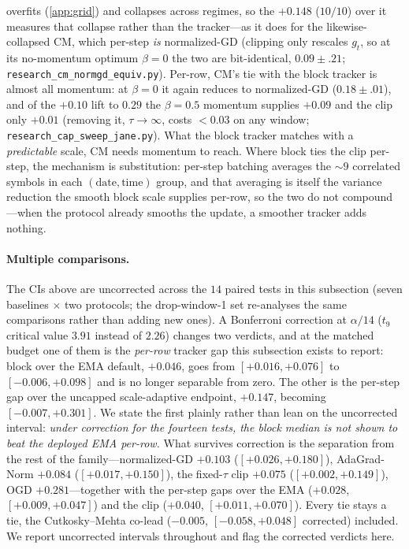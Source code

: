 \documentclass{article}
\newcommand{\gt}{g_t}
\begin{document}
overfits (\cref{app:grid}) and collapses across regimes, so the $+0.148$ ($10/10$) over it
measures that collapse rather than the tracker---as it does for the likewise-collapsed CM,
which per-step
\emph{is} normalized-GD (clipping only rescales $\gt$, so at its no-momentum optimum $\beta{=}0$
the two are bit-identical, $0.09\!\pm\!.21$; \texttt{research\_cm\_normgd\_equiv.py}). Per-row,
CM's tie with the block tracker is almost all momentum: at $\beta{=}0$ it again reduces to
normalized-GD ($0.18\!\pm\!.01$), and of the $+0.10$ lift to $0.29$ the $\beta{=}0.5$ momentum
supplies ${+}0.09$ and the clip only ${+}0.01$ (removing it, $\tau\!\to\!\infty$, costs
${<}0.03$ on any window; \texttt{research\_cap\_sweep\_jane.py}). What the block tracker matches
with a \emph{predictable} scale, CM needs momentum to reach. Where block ties
the clip per-step, the mechanism is substitution: per-step batching averages the $\sim\!9$
correlated symbols in each $(\text{date},\text{time})$ group, and that averaging is itself the
variance reduction the smooth block scale supplies per-row, so the two do not compound---when
the protocol already smooths the update, a smoother tracker adds nothing.

\paragraph{Multiple comparisons.} The CIs above are uncorrected across the $14$ paired tests in
this subsection (seven baselines $\times$ two protocols; the drop-window-1 set re-analyses the
same comparisons rather than adding new ones). A Bonferroni correction at
$\alpha/14$ ($t_9$ critical value $3.91$ instead of $2.26$) changes two verdicts, and at the
matched budget one of them is the \emph{per-row} tracker gap this subsection exists to report:
block over the EMA default, $+0.046$, goes from $[+0.016,+0.076]$ to $[-0.006,+0.098]$ and is no
longer separable from zero. The other is the per-step gap over the uncapped scale-adaptive
endpoint, $+0.147$, becoming $[-0.007,+0.301]$. We state the first plainly rather than lean on
the uncorrected interval: \emph{under correction for the fourteen tests, the block median is not
shown to beat the deployed EMA per-row.} What survives correction is the separation from the
rest of the family---normalized-GD $+0.103$ ($[+0.026,+0.180]$), AdaGrad-Norm $+0.084$
($[+0.017,+0.150]$), the fixed-$\tau$ clip $+0.075$ ($[+0.002,+0.149]$), OGD $+0.281$---together
with the per-step gaps over the EMA ($+0.028$, $[+0.009,+0.047]$) and the clip ($+0.040$,
$[+0.011,+0.070]$). Every tie stays a tie, the Cutkosky--Mehta co-lead ($-0.005$,
$[-0.058,+0.048]$ corrected) included. We report uncorrected intervals throughout and flag the
corrected verdicts here.
\end{document}
